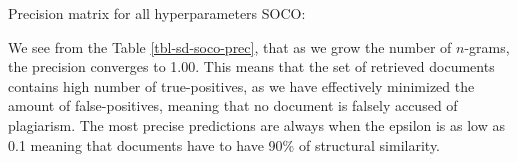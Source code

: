 Precision matrix for all hyperparameters SOCO:

\begin{table}[ht]
\centering
\caption{Precision for plagiarized documents ranging various $n$-gram lengths and $\varepsilon$-ranges for SOCO. Values close or over 0.9 are bolded.}
\label{tbl-sd-soco-prec}
\end{table}


We see from the Table \ref{tbl-sd-soco-prec}, that as we grow the number of $n$-grams, the precision converges to 1.00. This means that the set of retrieved documents contains high number of true-positives, as we have effectively minimized the amount of false-positives, meaning that no document is falsely accused of plagiarism. The most precise predictions are always when the epsilon is as low as 0.1 meaning that documents have to have 90\% of structural similarity. 

